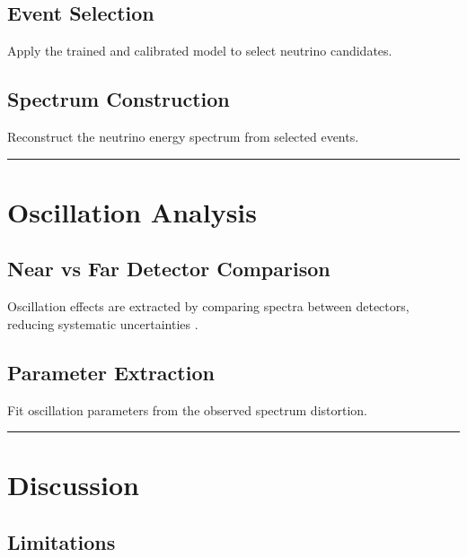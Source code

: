 \documentclass[
  authoryear,
  preprint]{elsarticle}
\begin{document}
\subsection{Event Selection}\label{event-selection}

Apply the trained and calibrated model to select neutrino candidates.

\subsection{Spectrum Construction}\label{spectrum-construction}

Reconstruct the neutrino energy spectrum from selected events.

\begin{center}\rule{0.5\linewidth}{0.5pt}\end{center}

\section{Oscillation Analysis}\label{oscillation-analysis}

\subsection{Near vs Far Detector
Comparison}\label{near-vs-far-detector-comparison}

Oscillation effects are extracted by comparing spectra between
detectors, reducing systematic uncertainties .

\subsection{Parameter Extraction}\label{parameter-extraction}

Fit oscillation parameters from the observed spectrum distortion.

\begin{center}\rule{0.5\linewidth}{0.5pt}\end{center}

\section{Discussion}\label{discussion}

\subsection{Limitations}\label{limitations}
\end{document}
